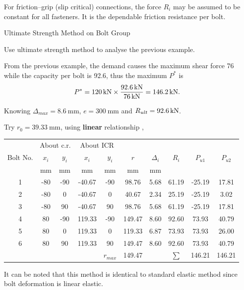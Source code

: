 For friction--grip (slip critical) connections, the force $R_i$ may be assumed to be constant for all fasteners. It is the dependable friction resistance per bolt.
\begin{exmp}
Ultimate Strength Method on Bolt Group

Use ultimate strength method to analyse the previous example.
\end{exmp}
\begin{solution}
From the previous example, the demand causes the maximum shear force \SI{76}{\kn} while the capacity per bolt is \SI{92.6}{\kn}, thus the maximum $P^*$ is
\begin{gather*}
P^*=\SI{120}{\kilo\newton}\times\dfrac{\SI{92.6}{\kilo\newton}}{\SI{76}{\kilo\newton}}=\SI{146.2}{\kilo\newton}.
\end{gather*}

Knowing $\Delta_{max}=\SI{8.6}{\mm}$, $e=\SI{300}{\mm}$ and $R_{ult}=\SI{92.6}{\kilo\newton}$.

Try $r_0=\SI{39.33}{\mm}$, using \textbf{linear} relationship ,
\begin{table}[H]
\centering
\begin{tabular}{cccccccccc}
	\toprule
	         & \multicolumn{2}{c}{About c.r.} & \multicolumn{2}{c}{About ICR} &          &            &          &          &          \\
	Bolt No. &  $x_i$   &        $y_i$        &  $x_i$   &       $y_i$        &   $r$    & $\Delta_i$ &  $R_i$   & $P_{u1}$ & $P_{u2}$ \\
	         & \si{\mm} &      \si{\mm}       & \si{\mm} &      \si{\mm}      & \si{\mm} &  \si{\mm}  & \si{\kn} & \si{\kn} & \si{\kn} \\ \midrule
	   1     &   -80    &         -90         &  -40.67  &        -90         &  98.76   &    5.68    &  61.19   &  -25.19  &  17.81   \\
	   2     &   -80    &          0          &  -40.67  &         0          &  40.67   &    2.34    &  25.19   &  -25.19  &   3.02   \\
	   3     &   -80    &         90          &  -40.67  &         90         &  98.76   &    5.68    &  61.19   &  -25.19  &  17.81   \\
	   4     &    80    &         -90         &  119.33  &        -90         &  149.47  &    8.60    &  92.60   &  73.93   &  40.79   \\
	   5     &    80    &          0          &  119.33  &         0          &  119.33  &    6.87    &  73.93   &  73.93   &  26.00   \\
	   6     &    80    &         90          &  119.33  &         90         &  149.47  &    8.60    &  92.60   &  73.93   &  40.79   \\ \bottomrule
	         &          &                     &          &     $r_{max}$      &  149.47  &            &  $\sum$  &  146.21  &  146.21
\end{tabular}
\end{table}
It can be noted that this method is identical to standard elastic method since bolt deformation is linear elastic.


\end{solution}
